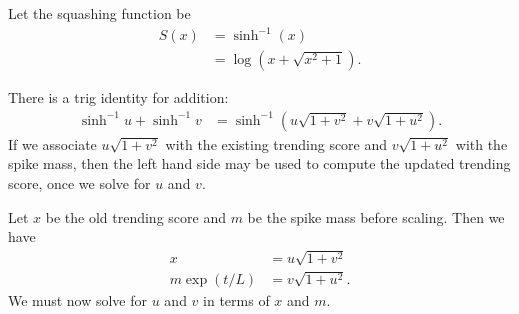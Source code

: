 \documentclass[a4paper, 12pt]{article}
\title{}
\author{Brendon J. Brewer}
\date{}
\newcommand{\asin}{\sinh^{-1}}
\begin{document}
\maketitle


\setlength{\parindent}{0pt}
\setlength{\parskip}{8pt}

Let the squashing function be
\begin{align}
S(x)
    &= \asin(x) \\
    &= \log\left(x + \sqrt{x^2 + 1}\right).    
\end{align}

There is a trig identity for addition:
\begin{align}
\asin u + \asin v &= \asin\left(u\sqrt{1+v^2} + v\sqrt{1+u^2}\right).
\end{align}
If we associate $u\sqrt{1+v^2}$ with the existing trending score
and $v\sqrt{1+u^2}$ with the spike mass, then the left hand side may be used
to compute the updated trending score, once we solve for $u$ and $v$.

Let $x$ be the old trending score and $m$ be the spike mass before scaling.
Then we have
\begin{align}
x &= u\sqrt{1+v^2} \\
m\exp(t/L) &= v\sqrt{1+u^2}.
\end{align}
We must now solve for $u$ and $v$ in terms of $x$ and $m$.
\end{document}
